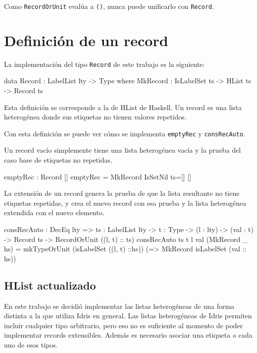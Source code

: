 Como \texttt{RecordOrUnit} evalúa a \texttt{()}, nunca puede unificarlo con \texttt{Record}.

\section{Definición de un record}

La implementación del tipo \texttt{Record} de este trabajo es la siguiente:

\begin{code}
data Record : LabelList lty -> Type where
  MkRecord : IsLabelSet ts -> HList ts -> Record ts
\end{code}

Esta definición se corresponde a la de HList de Haskell. Un record es una lista heterogénea donde sus etiquetas no tienen valores repetidos.

Con esta definición se puede ver cómo se implementa \texttt{emptyRec} y \texttt{consRecAuto}.

Un record vacío simplemente tiene una lista heterogénea vacía y la prueba del caso base de etiquetas no repetidas.

\begin{code}
emptyRec : Record []
emptyRec = MkRecord IsSetNil {ts=[]} []
\end{code}

La extensión de un record genera la prueba de que la lista resultante no tiene etiquetas repetidas, y crea el nuevo record con esa prueba y la lista heterogénea extendida con el nuevo elemento.

\begin{code}
consRecAuto : DecEq lty => {ts : LabelList lty} ->
  {t : Type} -> (l : lty) -> (val : t) -> Record ts ->
  RecordOrUnit ((l, t) :: ts)
consRecAuto {ts} {t} l val (MkRecord _ hs) =
  mkTypeOrUnit (isLabelSet ((l, t) ::hs))
  (\isLabelSet => MkRecord isLabelSet (val :: hs))
\end{code}

\subsection{HList actualizado}

En este trabajo se decidió implementar las listas heterogéneas de una forma distinta a la que utiliza Idris en general. Las listas heterogéneas de Idris permiten incluir cualquier tipo arbitrario, pero eso no es suficiente al momento de poder implementar records extensibles. Además es necesario asociar una etiqueta a cada uno de esos tipos.

